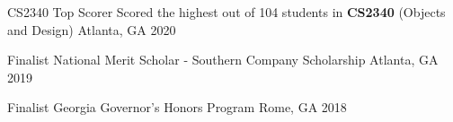




\begin{cvhonors}


\cvhonor
{CS2340 Top Scorer} %
{Scored the highest out of 104 students in \textbf{CS2340} (Objects and Design)} %
{Atlanta, GA} %
{2020} %

\cvhonor
{Finalist} %
{National Merit Scholar - Southern Company Scholarship} %
{Atlanta, GA} %
{2019} %


\cvhonor
{Finalist} %
{Georgia Governor's Honors Program} %
{Rome, GA} %
{2018} %




\end{cvhonors}






